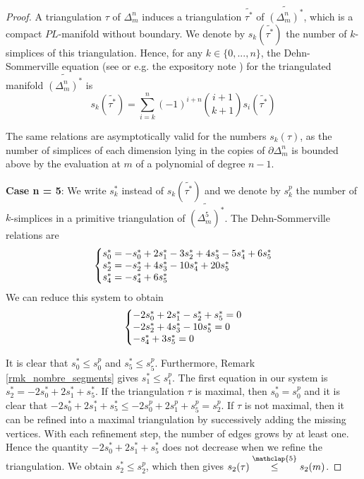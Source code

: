 \documentclass[12pt]{article}
\newcommand\customleqcinq{\stackrel{\mathclap{\normalfont\scriptsize\mbox{5}}}{\leq}}
\theoremstyle{definition}
\begin{document}
\begin{proof}
    A triangulation $\tau$ of $\Delta_m^n$ induces a triangulation $\widetilde{\tau^*}$ of $\widetilde{(\Delta_m^n)^*}$, which is a compact $PL$-manifold without boundary. We denote by $s_k(\widetilde{\tau^*})$ the number of $k$-simplices of this triangulation. Hence, for any $k \in \{0,...,n \}$, the Dehn-Sommerville equation (see \cite{dehnsommerville} or e.g. the expository note \cite{dehnsommerville2}) for the triangulated manifold $\widetilde{(\Delta_m^n)^*}$ is
    \begin{equation*}
        s_k(\widetilde{\tau^*}) = \sum_{i=k}^{n} (-1)^{i+n} {i+1 \choose k+1} s_i(\widetilde{\tau^*})
    \end{equation*}
    
    The same relations are asymptotically valid for the numbers $s_k(\tau)$, as the number of simplices of each dimension lying in the copies of $\partial \Delta_m^n$ is bounded above by the evaluation at $m$ of a polynomial of degree $n-1$.

    \textbf{Case n = 5}: We write $s_k^*$ instead of $s_k(\widetilde{\tau^*})$ and we denote by $s_k^p$ the number of $k$-simplices in a primitive triangulation of $\widetilde{(\Delta_m^5)^*}$. The Dehn-Sommerville relations are
    \begin{equation*}
        \left\{\begin{array}{@{}l@{}}
            s_0^* = -s_0^* + 2s_1^* - 3s_2^* + 4s_3^* - 5s_4^* + 6s_5^*\\
            s_2^* = -s_2^* + 4s_3^* - 10 s_4^* + 20 s_5^*\\
            s_4^* = -s_4^* + 6s_5^*
        \end{array}\right.
    \end{equation*}
    We can reduce this system to obtain
    \begin{equation*}
        \left\{\begin{array}{@{}l@{}}
            -2s_0^* + 2s_1^* - s_2^* + s_5^* = 0\\
            -2s_2^* + 4s_3^* - 10 s_5^* = 0\\
            -s_4^* + 3s_5^* = 0
        \end{array}\right.
    \end{equation*}

    It is clear that $s_0^* \leq s_0^p$ and $s_5^* \leq s_5^p$. Furthermore, Remark \ref{rmk_nombre_segments} gives $s_1^* \leq s_1^p$. The first equation in our system is $s_2^* = -2s_0^* + 2s_1^* + s_5^*$. If the triangulation $\tau$ is maximal, then $s_0^* = s_0^p$ and it is clear that $-2s_0^* + 2s_1^* + s_5^* \leq -2s_0^p + 2s_1^p + s_5^p = s_2^p$. If $\tau$ is not maximal, then it can be refined into a maximal triangulation by successively adding the missing vertices. With each refinement step, the number of edges grows by at least one. Hence the quantity $-2s_0^* + 2s_1^* + s_5^*$ does not decrease when we refine the triangulation. We obtain $s_2^* \leq s_2^p$, which then gives $s_2(\tau) \customleqcinq s_2(m)$.


\end{proof}
\end{document}
